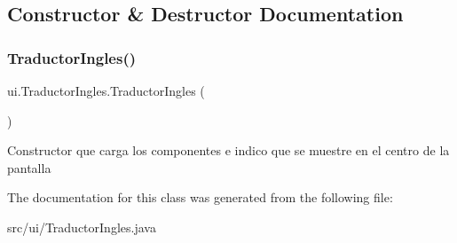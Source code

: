 \subsection{Constructor \& Destructor Documentation}
\mbox{\label{classui_1_1_traductor_ingles_a42afbb0d287dd889fac0fcdd1c982166}} 
\subsubsection{\texorpdfstring{TraductorIngles()}{TraductorIngles()}}
{\footnotesize\ttfamily ui.\+Traductor\+Ingles.\+Traductor\+Ingles (\begin{DoxyParamCaption}{ }\end{DoxyParamCaption})\hspace{0.3cm}{\ttfamily [inline]}}

Constructor que carga los componentes e indico que se muestre en el centro de la pantalla 

The documentation for this class was generated from the following file\+:\begin{DoxyCompactItemize}
\item 
src/ui/Traductor\+Ingles.\+java\end{DoxyCompactItemize}
